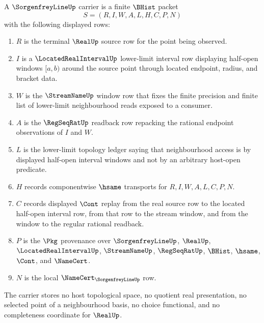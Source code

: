 \begin{definition}
\label{def:sorgenfrey-line-carrier}
A $\SorgenfreyLineUp$ carrier is a finite $\BHist$ packet
$$
S=(R,I,W,A,L,H,C,P,N)
$$
with the following displayed rows:
\begin{enumerate}
\item $R$ is the terminal $\RealUp$ source row for the point being observed.
\item $I$ is a $\LocatedRealIntervalUp$ lower-limit interval row displaying half-open windows $[a,b)$ around the source point through located endpoint, radius, and bracket data.
\item $W$ is the $\StreamNameUp$ window row that fixes the finite precision and finite list of lower-limit neighbourhood reads exposed to a consumer.
\item $A$ is the $\RegSeqRatUp$ readback row repacking the rational endpoint observations of $I$ and $W$.
\item $L$ is the lower-limit topology ledger saying that neighbourhood access is by displayed half-open interval windows and not by an arbitrary host-open predicate.
\item $H$ records componentwise $\hsame$ transports for $R,I,W,A,L,C,P,N$.
\item $C$ records displayed $\Cont$ replay from the real source row to the located half-open interval row, from that row to the stream window, and from the window to the regular rational readback.
\item $P$ is the $\Pkg$ provenance over $\SorgenfreyLineUp$, $\RealUp$, $\LocatedRealIntervalUp$, $\StreamNameUp$, $\RegSeqRatUp$, $\BHist$, $\hsame$, $\Cont$, and $\NameCert$.
\item $N$ is the local $\NameCert_{\SorgenfreyLineUp}$ row.
\end{enumerate}
The carrier stores no host topological space, no quotient real presentation, no selected point of a neighbourhood basis, no choice functional, and no completeness coordinate for $\RealUp$.
\end{definition}


